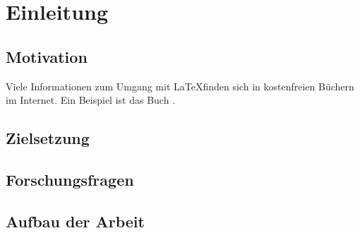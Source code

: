 \chapter{Einleitung}

\section{Motivation}

Viele Informationen zum Umgang mit \LaTeX finden sich in kostenfreien Büchern im Internet. Ein Beispiel ist das Buch  \autocite{oetiker_2022}.

\lipsum[1]

\section{Zielsetzung}

\lipsum[2]

\section{Forschungsfragen}

\lipsum[3-4]

\section{Aufbau der Arbeit}

\lipsum[5-8]